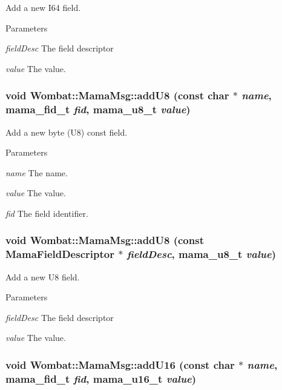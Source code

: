 Add a new I64 field. 
\begin{DoxyParams}{Parameters}
\item[{\em fieldDesc}]The field descriptor \item[{\em value}]The value. \end{DoxyParams}
\hypertarget{classWombat_1_1MamaMsg_a931fb98ca16997dd63ecdc4438ff5708}{
\subsubsection[{addU8}]{\setlength{\rightskip}{0pt plus 5cm}void Wombat::MamaMsg::addU8 (const char $\ast$ {\em name}, \/  mama\_\-fid\_\-t {\em fid}, \/  mama\_\-u8\_\-t {\em value})}}
\label{classWombat_1_1MamaMsg_a931fb98ca16997dd63ecdc4438ff5708}


Add a new byte (U8) const field. 
\begin{DoxyParams}{Parameters}
\item[{\em name}]The name. \item[{\em value}]The value. \item[{\em fid}]The field identifier. \end{DoxyParams}
\hypertarget{classWombat_1_1MamaMsg_aa3fc0486457904f3b1cc324b24afcc94}{
\subsubsection[{addU8}]{\setlength{\rightskip}{0pt plus 5cm}void Wombat::MamaMsg::addU8 (const {\bf MamaFieldDescriptor} $\ast$ {\em fieldDesc}, \/  mama\_\-u8\_\-t {\em value})}}
\label{classWombat_1_1MamaMsg_aa3fc0486457904f3b1cc324b24afcc94}


Add a new U8 field. 
\begin{DoxyParams}{Parameters}
\item[{\em fieldDesc}]The field descriptor \item[{\em value}]The value. \end{DoxyParams}
\hypertarget{classWombat_1_1MamaMsg_a54bc3aa317e0d841b384ff530c471575}{
\subsubsection[{addU16}]{\setlength{\rightskip}{0pt plus 5cm}void Wombat::MamaMsg::addU16 (const char $\ast$ {\em name}, \/  mama\_\-fid\_\-t {\em fid}, \/  mama\_\-u16\_\-t {\em value})}}
\label{classWombat_1_1MamaMsg_a54bc3aa317e0d841b384ff530c471575}


